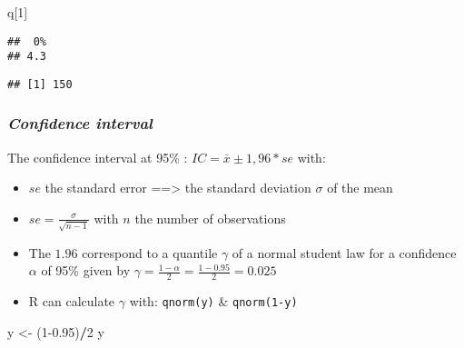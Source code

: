 \documentclass[
]{article}
\newenvironment{Shaded}{\begin{snugshade}}{\end{snugshade}}
\newcommand{\CommentTok}[1]{\textcolor[rgb]{0.56,0.35,0.01}{\textit{#1}}}
\newcommand{\DecValTok}[1]{\textcolor[rgb]{0.00,0.00,0.81}{#1}}
\newcommand{\FloatTok}[1]{\textcolor[rgb]{0.00,0.00,0.81}{#1}}
\newcommand{\FunctionTok}[1]{\textcolor[rgb]{0.13,0.29,0.53}{\textbf{#1}}}
\newcommand{\NormalTok}[1]{#1}
\newcommand{\OtherTok}[1]{\textcolor[rgb]{0.56,0.35,0.01}{#1}}
\newcommand{\SpecialCharTok}[1]{\textcolor[rgb]{0.81,0.36,0.00}{\textbf{#1}}}
\providecommand{\tightlist}{%
  \setlength{\itemsep}{0pt}\setlength{\parskip}{0pt}}
\begin{document}
\begin{Shaded}
\begin{Highlighting}[]
\NormalTok{q[}\DecValTok{1}\NormalTok{]}
\end{Highlighting}
\end{Shaded}

\begin{verbatim}
##  0% 
## 4.3
\end{verbatim}

\begin{Shaded}
\end{Shaded}

\begin{verbatim}
## [1] 150
\end{verbatim}

\hypertarget{confidence-interval}{%
\subsubsection{\texorpdfstring{\emph{Confidence
interval}}{Confidence interval}}\label{confidence-interval}}

The confidence interval at 95\% : \(IC=\bar{x}\pm1,96*se\) with:

\begin{itemize}
\tightlist
\item
  \(se\) the standard error ==\textgreater{} the standard deviation
  \(\sigma\) of the mean
\item
  \(se=\frac{\sigma}{\sqrt{n-1}}\) with \(n\) the number of observations
\item
  The \(1.96\) correspond to a quantile \(\gamma\) of a normal student
  law for a confidence \(\alpha\) of 95\% given by
  \(\gamma=\frac{1-\alpha}{2} = \frac{1-0.95}{2}=0.025\)
\item
  R can calculate \(\gamma\) with: \texttt{qnorm(y)} \&
  \texttt{qnorm(1-y)}\\
\end{itemize}

\begin{Shaded}
\begin{Highlighting}[]
\NormalTok{y }\OtherTok{\textless{}{-}}\NormalTok{ (}\DecValTok{1}\FloatTok{{-}0.95}\NormalTok{)}\SpecialCharTok{/}\DecValTok{2}
\NormalTok{y}
\end{Highlighting}
\end{Shaded}
\end{document}
